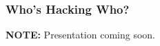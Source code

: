 \documentclass{beamer}
\begin{document}
  \begin{frame}
    \frametitle{Who's Hacking Who?}
    \textbf{NOTE:} Presentation coming soon.
  \end{frame}
\end{document}
